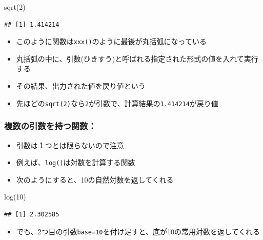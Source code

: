 \documentclass[
]{book}
\newenvironment{Shaded}{\begin{snugshade}}{\end{snugshade}}
\newcommand{\DecValTok}[1]{\textcolor[rgb]{0.00,0.00,0.81}{#1}}
\newcommand{\FunctionTok}[1]{\textcolor[rgb]{0.00,0.00,0.00}{#1}}
\newcommand{\NormalTok}[1]{#1}
\providecommand{\tightlist}{%
  \setlength{\itemsep}{0pt}\setlength{\parskip}{0pt}}
\begin{document}
\begin{Shaded}
\begin{Highlighting}[]
\FunctionTok{sqrt}\NormalTok{(}\DecValTok{2}\NormalTok{)}
\end{Highlighting}
\end{Shaded}

\begin{verbatim}
## [1] 1.414214
\end{verbatim}

\begin{itemize}
\tightlist
\item
  このように関数は\texttt{xxx()}のように最後が丸括弧になっている
\item
  丸括弧の中に、引数(ひきすう)と呼ばれる指定された形式の値を入れて実行する
\item
  その結果、出力された値を戻り値という
\item
  先ほどの\texttt{sqrt(2)}なら\texttt{2}が引数で、計算結果の\texttt{1.414214}が戻り値
\end{itemize}

\hypertarget{ux8907ux6570ux306eux5f15ux6570ux3092ux6301ux3064ux95a2ux6570}{%
\subsubsection*{複数の引数を持つ関数：}\label{ux8907ux6570ux306eux5f15ux6570ux3092ux6301ux3064ux95a2ux6570}}

\begin{itemize}
\tightlist
\item
  引数は１つとは限らないので注意
\item
  例えば、\texttt{log()}は対数を計算する関数
\item
  次のようにすると、10の自然対数を返してくれる
\end{itemize}

\begin{Shaded}
\begin{Highlighting}[]
\FunctionTok{log}\NormalTok{(}\DecValTok{10}\NormalTok{)}
\end{Highlighting}
\end{Shaded}

\begin{verbatim}
## [1] 2.302585
\end{verbatim}

\begin{itemize}
\tightlist
\item
  でも、2つ目の引数\texttt{base=10}を付け足すと、底が10の常用対数を返してくれる
\end{itemize}
\end{document}
